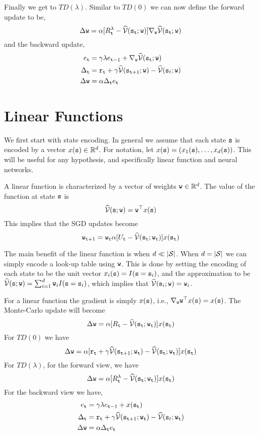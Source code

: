 Finally we get to $TD(\lambda)$. Similar to $TD(0)$ we can now
define the forward update to be,
\[
\Delta {\tt w} =  \alpha[R^\lambda_{\tt t}
-\widehat{\mathcal{V}}({\tt s}_{\tt t};{\tt w})]\nabla_{\tt w}
\widehat{\mathcal{V}}({\tt s}_{\tt t};{\tt w})
\]
and the backward update,
\begin{align*}
e_{\tt t} &= \gamma\lambda e_{{\tt t}-1}+\nabla_{\tt w} \widehat{\mathcal{V}}({\tt s}_{\tt t};{\tt w})\\
\Delta_{\tt t} &= {\tt r}_{\tt t}+\gamma \widehat{\mathcal{V}}({\tt s}_{{\tt t}+1};{\tt w})-\widehat{\mathcal{V}}({\tt s}_{t};{\tt w})\\
\Delta {\tt w} &= \alpha \Delta_{\tt t} e_{\tt t}
\end{align*}


\section{Linear Functions}

We first start with state encoding. In general we assume that
each state ${\tt s}$ is encoded by a vector $x({\tt s})\in
\mathbb{R}^d$. For notation, let $x({\tt s})=(x_1({\tt s}),\ldots ,
x_d({\tt s}))$. This will be useful for any hypothesis, and
specifically linear function and neural networks.

A linear function is characterized by a vector of weights
${\tt w}\in \mathbb{R}^d$. The value of the function at state
${\tt s}$ is
\[
\widehat{\mathcal{V}}({\tt s};{\tt w})={\tt w}^\top x({\tt s})
\]
This implies that the SGD updates become
\[
{\tt w}_{{\tt t}+1}={\tt w}_{\tt t} \alpha[U_{\tt t}
-\widehat{\mathcal{V}}({\tt s}_{\tt t};{\tt w}_{\tt t})]x({\tt s}_{\tt t})
\]

The main benefit of the linear function is when $d\ll |\mathcal{S}|$.
When $d=|\mathcal{S}|$ we can simply encode a look-up table using
${\tt w}$. This is done by setting the encoding of each state to be
the unit vector $x_i({\tt s})=I({\tt s}={\tt s}_i)$, and the
approximation to be $\widehat{\mathcal{V}}({\tt s};{\tt w})=\sum_{i=1}^d
{\tt w}_i I({\tt s}={\tt s}_i)$, which implies that
$\widehat{\mathcal{V}}({\tt s}_i;{\tt w})={\tt w}_i$.

For a linear function the gradient is simply $x({\tt s})$, i.e.,
$\nabla_{\tt w} {\tt w}^\top x({\tt s})=x({\tt s})$. The Monte-Carlo
update will become
\[
\Delta {\tt w}=
\alpha[R_{\tt t}-\widehat{\mathcal{V}}({\tt s}_{\tt t};{\tt w}_{\tt t})]x({\tt s}_{\tt t})
\]
For $TD(0)$ we have
\[
\Delta {\tt w}= \alpha[{\tt r}_{\tt t}+\gamma
\widehat{\mathcal{V}}({\tt s}_{{\tt t}+1};{\tt w}_{\tt t})-\widehat{\mathcal{V}}({\tt s}_{\tt t};{\tt w}_{\tt t})]x({\tt s}_{\tt t})
\]
For $TD(\lambda)$, for the forward view, we have
\[
\Delta {\tt w}=
\alpha[R^\lambda_{\tt t}-\widehat{\mathcal{V}}({\tt s}_{\tt t};{\tt w}_{\tt t})]x({\tt s}_{\tt t})
\]
For the backward view we have,
\begin{align*}
e_{\tt t} &= \gamma\lambda e_{{\tt t}-1}+x({\tt s}_{\tt t})\\
\Delta_{\tt t} &= {\tt r}_{\tt t}+\gamma \widehat{\mathcal{V}}({\tt s}_{{\tt t}+1};{\tt w}_{\tt t})-\widehat{\mathcal{V}}({\tt s}_{t};{\tt w}_{\tt t})\\
\Delta {\tt w} &= \alpha \Delta_{\tt t} e_{\tt t}
\end{align*}

